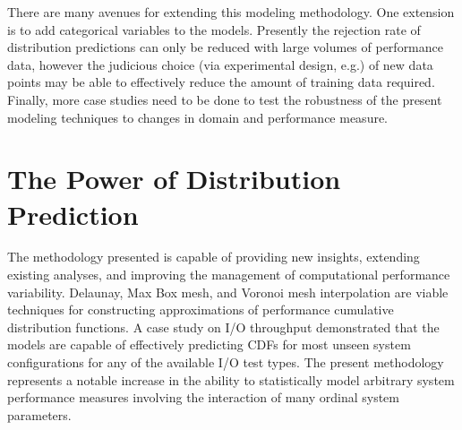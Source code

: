 There are many avenues for extending this modeling methodology. One extension is to add categorical variables to the models. Presently the rejection rate of distribution predictions can only be reduced with large volumes of performance data, however the judicious choice (via experimental design, e.g.) of new data points may be able to effectively reduce the amount of training data required. Finally, more case studies need to be done to test the robustness of the present modeling techniques to changes in domain and performance measure.

\section{The Power of Distribution Prediction}

The methodology presented is capable of providing new insights, extending existing analyses, and improving the management of computational performance variability. Delaunay, Max Box mesh, and Voronoi mesh interpolation are viable techniques for constructing approximations of performance cumulative distribution functions. A case study on I/O throughput demonstrated that the models are capable of effectively predicting CDFs for most unseen system configurations for any of the available I/O test types. The present methodology represents a notable increase in the ability to statistically model arbitrary system performance measures involving the interaction of many ordinal system parameters.
